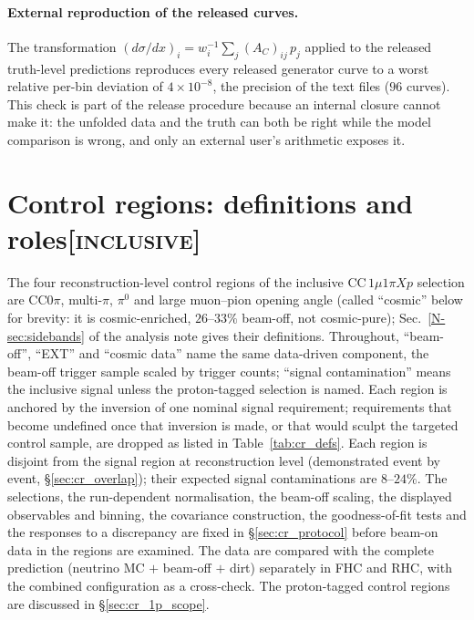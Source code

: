 \documentclass[11pt,a4paper]{article}
\newcommand{\noteref}[2]{#1~\ref{N-#2} of the analysis note}
\newcommand{\scopetag}[1]{\hfill{\normalfont\small\textsc{[#1]}}}
\begin{document}
\paragraph{External reproduction of the released curves.}
The transformation $\left(d\sigma/dx\right)_i = w_i^{-1}\sum_j (A_C)_{ij}\,p_j$
applied to the released truth-level predictions reproduces every released generator curve
to a worst relative per-bin deviation of $4\times10^{-8}$, the precision of the text files
($96$ curves). This check is part of the release
procedure because an internal closure cannot make it: the unfolded
data and the truth can both be right while the model comparison is wrong, and only an
external user's arithmetic exposes it.



\section[Control regions: definitions and roles]{Control regions: definitions and roles\scopetag{inclusive}}
\label{sec:request}

The four reconstruction-level control regions of the inclusive $\mathrm{CC}\,1\mu1\pi Xp$ selection
are CC$0\pi$, multi-$\pi$, $\pi^0$ and large muon--pion opening angle (called ``cosmic'' below for
brevity: it is cosmic-enriched, $26$--$33\%$ beam-off, not cosmic-pure); \noteref{Sec.}{sec:sidebands}
gives their definitions. Throughout, ``beam-off'', ``EXT'' and ``cosmic data'' name the same data-driven
component, the beam-off trigger sample scaled by trigger counts; ``signal contamination'' means the
inclusive signal unless the proton-tagged selection is named. Each region is anchored by the inversion
of one nominal signal requirement; requirements that become undefined once that inversion is made, or
that would sculpt the targeted control sample, are dropped as listed in Table~\ref{tab:cr_defs}. Each
region is disjoint from the signal region at reconstruction level (demonstrated event by event,
\S\ref{sec:cr_overlap}); their expected signal contaminations are $8$--$24\%$. The selections, the
run-dependent normalisation, the beam-off scaling, the displayed observables and binning, the covariance
construction, the goodness-of-fit tests and the responses to a discrepancy are fixed in
\S\ref{sec:cr_protocol} before beam-on data in the regions are examined. The data are compared with the
complete prediction (neutrino MC $+$ beam-off $+$ dirt) separately in FHC and RHC, with the combined
configuration as a cross-check. The proton-tagged control regions are discussed in
\S\ref{sec:cr_1p_scope}.
\end{document}
